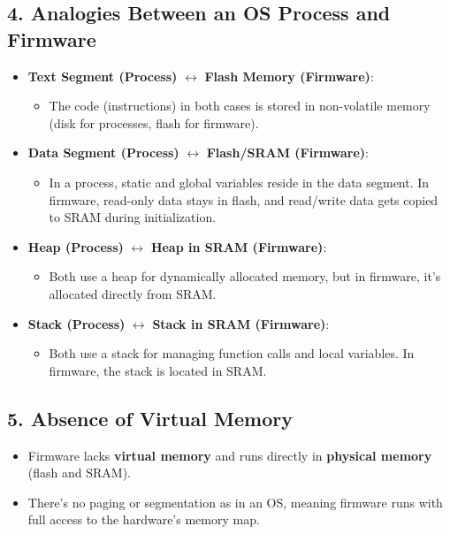 \documentclass{article}
\begin{document}
\subsection*{4. Analogies Between an OS Process and Firmware}
\begin{itemize}
    \item \textbf{Text Segment (Process)} $\leftrightarrow$ \textbf{Flash Memory (Firmware)}:
    \begin{itemize}
        \item The code (instructions) in both cases is stored in non-volatile memory (disk for processes, flash for firmware).
    \end{itemize}
    \item \textbf{Data Segment (Process)} $\leftrightarrow$ \textbf{Flash/SRAM (Firmware)}:
    \begin{itemize}
        \item In a process, static and global variables reside in the data segment. In firmware, read-only data stays in flash, and read/write data gets copied to SRAM during initialization.
    \end{itemize}
    \item \textbf{Heap (Process)} $\leftrightarrow$ \textbf{Heap in SRAM (Firmware)}:
    \begin{itemize}
        \item Both use a heap for dynamically allocated memory, but in firmware, it's allocated directly from SRAM.
    \end{itemize}
    \item \textbf{Stack (Process)} $\leftrightarrow$ \textbf{Stack in SRAM (Firmware)}:
    \begin{itemize}
        \item Both use a stack for managing function calls and local variables. In firmware, the stack is located in SRAM.
    \end{itemize}
\end{itemize}

\subsection*{5. Absence of Virtual Memory}
\begin{itemize}
    \item Firmware lacks \textbf{virtual memory} and runs directly in \textbf{physical memory} (flash and SRAM).
    \item There’s no paging or segmentation as in an OS, meaning firmware runs with full access to the hardware's memory map.
\end{itemize}
\end{document}
